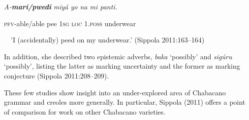 \begin{listWWNumiileveli}
\item 
\begin{stylelsLanginfo}
\textit{A-}\textbf{\textit{mari/pwedi}}\textit{ miyá yo na mi panti.}
\end{stylelsLanginfo}
\end{listWWNumiileveli}
\begin{stylelsIMT}
\textsc{pfv}{}-able/able pee 1\textsc{sg} \textsc{loc} 1.\textsc{poss} underwear 
\end{stylelsIMT}

\begin{stylelsIMT}
\ \ {}'I (accidentally) peed on my underwear.' (Sippola 2011:163–164)
\end{stylelsIMT}

\begin{stylelsLanginfo}
In addition, she described two epistemic adverbs, \textit{baka} ‘possibly’ and \textit{sigúru} ‘possibly’, listing the latter as marking uncertainty and the former as marking conjecture (Sippola 2011:208–209). 
\end{stylelsLanginfo}

\begin{stylelsLanginfo}
These few studies show insight into an under-explored area of Chabacano grammar and creoles more generally. In particular, Sippola (2011) offers a point of comparison for work on other Chabacano varieties.
\end{stylelsLanginfo}


